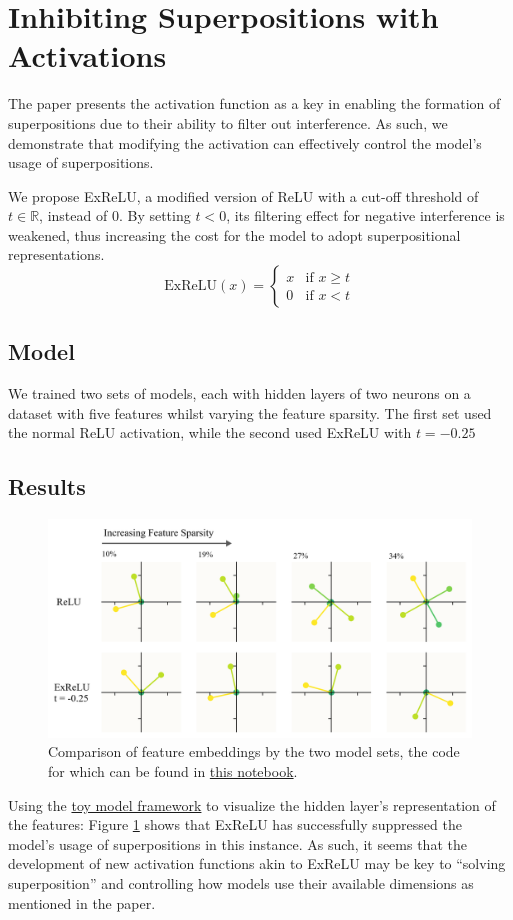 \section{Inhibiting Superpositions with Activations}
\label{sec:act_fns}
The paper presents the activation function as a key in enabling the formation of superpositions due to their ability to
filter out interference. As such, we demonstrate that modifying the activation can effectively control the model's usage of
superpositions.

We propose ExReLU, a modified version of ReLU with a cut-off threshold of $t \in \mathbb{R}$, instead of $0$. By setting $t < 0$, its filtering effect for negative interference is weakened, thus
increasing the cost for the model to adopt superpositional representations.
\[
	\text{ExReLU}(x) =
	\begin{cases}
		x & \text{if } x \geq t \\
		0 & \text{if } x < t
	\end{cases}
\]

\subsection{Model}
We trained two sets of models, each with hidden layers of two neurons on a dataset with five features whilst varying the feature
sparsity. The first set used the normal ReLU activation, while the second used ExReLU with $t=-0.25$

\subsection{Results}
\begin{figure}[h]
	\centering
	\includegraphics[width=1\linewidth]{figures/acts_diagram.png}
	\caption{Comparison of feature embeddings by the two model sets, the code for which can be found in \href{https://colab.research.google.com/github/smurphnerd/FIT5047-assignment4/blob/main/act_visuals.ipynb}{this notebook}.}
	\label{fig:acts_diagram}
\end{figure}
Using the \href{https://colab.research.google.com/github/anthropics/toy-models-of-superposition/blob/main/toy_models.ipynb}{toy model framework} to visualize the hidden layer's representation of the features:
Figure \ref{fig:acts_diagram} shows that ExReLU has successfully suppressed the model's usage of superpositions in this instance.
As such, it seems that the development of new activation functions akin to ExReLU may be key to ``solving superposition'' and controlling how models
use their available dimensions as mentioned in the paper.
